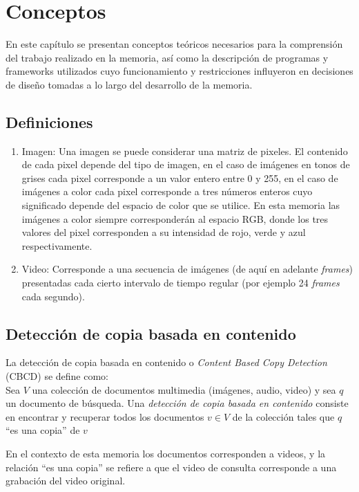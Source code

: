 \chapter{Conceptos}

En este capítulo se presentan conceptos teóricos necesarios para la comprensión del trabajo realizado en la memoria, así como la descripción de  programas y frameworks utilizados cuyo funcionamiento y restricciones influyeron en decisiones de diseño tomadas a lo largo del desarrollo de la memoria.

\section{Definiciones}
\begin{enumerate}
\item Imagen: Una imagen se puede considerar una matriz de pixeles. El contenido de cada pixel depende del tipo de imagen, en el caso de imágenes en tonos de grises cada pixel corresponde a un valor entero entre 0 y 255, en el caso de imágenes a color cada pixel corresponde a tres números enteros cuyo significado depende del espacio de color que se utilice. En esta memoria las imágenes a color siempre corresponderán al espacio RGB, donde los tres valores del pixel corresponden a su intensidad de rojo, verde y azul respectivamente.

\item Video: Corresponde a una secuencia de imágenes (de aquí en adelante \textit{frames}) presentadas cada cierto intervalo de tiempo regular (por ejemplo 24 \textit{frames} cada segundo). 
\end{enumerate}


\section{Detección de copia basada en contenido}

La detección de copia basada en contenido o \emph{Content Based Copy Detection} (CBCD) se define como: \\
Sea $V$ una colección de documentos multimedia (imágenes, audio, video) y sea $q$ un documento de búsqueda. Una \emph{detección de copia basada en contenido} consiste en encontrar y recuperar todos los documentos $v \in V$ de la colección tales que $q$ ``es una copia'' de $v$


En el contexto de esta memoria los documentos corresponden a videos, y la relación ``es una copia'' se refiere a que el video de consulta corresponde a una grabación del video original.

